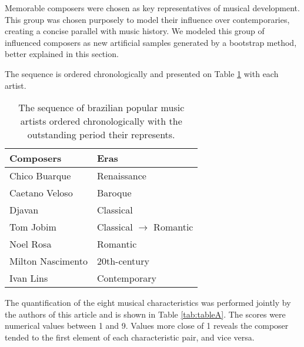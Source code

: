 \documentclass[
 aip,
 jmp,
 amsmath,amssymb,
 reprint,
]{revtex4-1}
\begin{document}
Memorable composers were chosen as key representatives
of musical development. 
This group was chosen purposely to model their influence
over contemporaries, creating a concise parallel with music history. We modeled this group of influenced
composers as new artificial samples generated by a bootstrap method, better
explained in this section.

The sequence
is ordered chronologically and presented on Table \ref{tab:table0} with
each artist.

\begin{table}[ht]
\caption{\label{tab:table0} The sequence of brazilian popular music artists ordered chronologically
with the outstanding period their represents.}

\begin{tabular}{|l||l|}
\hline

 Composers       &  Eras \\ \hline

 Chico Buarque   & Renaissance \\
 Caetano Veloso  & Baroque \\
 Djavan          & Classical \\
 Tom Jobim       & Classical $\to$ Romantic \\
 Noel Rosa       & Romantic \\
 Milton Nascimento  & 20th-century \\
 Ivan Lins       & Contemporary\\

\hline
\end{tabular}
\end{table}

The quantification of the eight musical
characteristics was performed jointly by the authors of this
article and is shown in Table \ref{tab:tableA}. The scores were
numerical values between 1 and 9. Values more close of 1 reveals the
composer tended to the first element of each characteristic pair, and
vice versa. 
\end{document}
